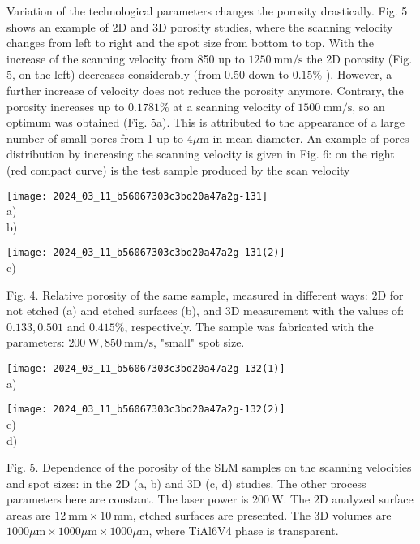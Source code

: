 \documentclass[10pt]{article}
\begin{document}
Variation of the technological parameters changes the porosity drastically. Fig. 5 shows an example of 2D and 3D porosity studies, where the scanning velocity changes from left to right and the spot size from bottom to top. With the increase of the scanning velocity from 850 up to $1250 \mathrm{~mm} / \mathrm{s}$ the 2D porosity (Fig. 5, on the left) decreases considerably (from 0.50 down to $0.15 \%$ ). However, a further increase of velocity does not reduce the porosity anymore. Contrary, the porosity increases up to $0.1781 \%$ at a scanning velocity of $1500 \mathrm{~mm} / \mathrm{s}$, so an optimum was obtained (Fig. 5a). This is attributed to the appearance of a large number of small pores from 1 up to $4 \mu \mathrm{m}$ in mean diameter. An example of pores distribution by increasing the scanning velocity is given in Fig. 6: on the right (red compact curve) is the test sample produced by the scan velocity

\texttt{[image: 2024\_03\_11\_b56067303c3bd20a47a2g-131]}\\
a)\\
b)

\texttt{[image: 2024\_03\_11\_b56067303c3bd20a47a2g-131(2)]}\\
c)

Fig. 4. Relative porosity of the same sample, measured in different ways: $2 \mathrm{D}$ for not etched (a) and etched surfaces (b), and 3D measurement with the values of: $0.133,0.501$ and $0.415 \%$, respectively. The sample was fabricated with the parameters: $200 \mathrm{~W}, 850 \mathrm{~mm} / \mathrm{s}$, "small" spot size.

\texttt{[image: 2024\_03\_11\_b56067303c3bd20a47a2g-132(1)]}\\
a)

\texttt{[image: 2024\_03\_11\_b56067303c3bd20a47a2g-132(2)]}\\
c)\\
d)

Fig. 5. Dependence of the porosity of the SLM samples on the scanning velocities and spot sizes: in the 2D (a, b) and 3D (c, d) studies. The other process parameters here are constant. The laser power is $200 \mathrm{~W}$. The $2 \mathrm{D}$ analyzed surface areas are $12 \mathrm{~mm} \times 10 \mathrm{~mm}$, etched surfaces are presented. The $3 \mathrm{D}$ volumes are $1000 \mu \mathrm{m} \times 1000 \mu \mathrm{m} \times 1000 \mu \mathrm{m}$, where TiAl6V4 phase is transparent.
\end{document}
